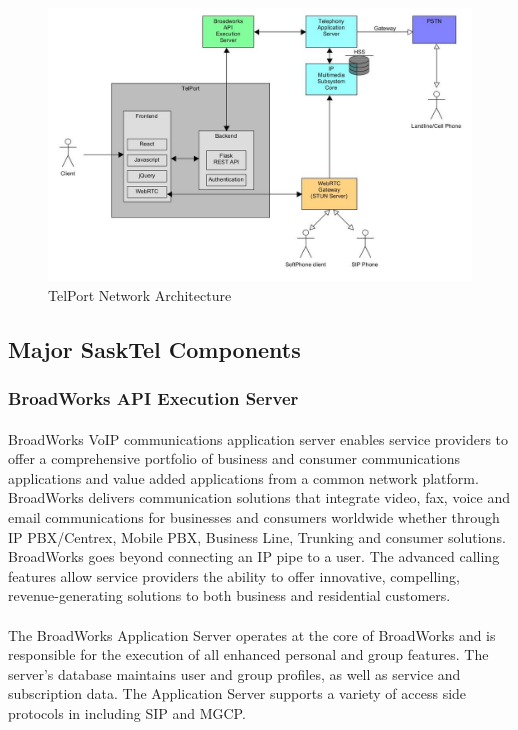 \documentclass[12pt]{article}
\begin{document}
	\begin{figure}
	\includegraphics[width=\textwidth]{ServerArchitecture.jpg}
	\caption{TelPort Network Architecture}
	\end{figure}

\pagebreak
\subsection{Major SaskTel Components}
\subsubsection{BroadWorks API Execution Server}
\paragraph{}
	BroadWorks VoIP communications application server enables service providers to offer a comprehensive portfolio of business and consumer communications applications and value added applications from a common network platform. BroadWorks delivers communication solutions that integrate video, fax, voice and email communications for businesses and consumers worldwide whether through IP PBX/Centrex, Mobile PBX, Business Line, Trunking and consumer solutions.  BroadWorks goes beyond connecting an IP pipe to a user. The advanced calling features allow service providers the ability to offer innovative, compelling, revenue-generating solutions to both business and residential customers.
 
\paragraph{}
	The BroadWorks Application Server operates at the core of BroadWorks and is responsible for the execution of all enhanced personal and group features. The server's database maintains user and group profiles, as well as service and subscription data. The Application Server supports a variety of access side protocols in including SIP and MGCP.
 
\end{document}
